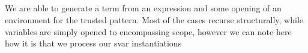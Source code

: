 {\begin{code}
\<%
\\
%
\>[4]\AgdaSpace{}%
\AgdaSymbol{(}\AgdaSpace{}%
\AgdaOperator{\AgdaInductiveConstructor{-,}}\AgdaSpace{}%
\AgdaSymbol{)}\AgdaSpace{}%
\AgdaSymbol{=}\AgdaSpace{}%
\AgdaSpace{}%
\AgdaSpace{}%
\AgdaOperator{\AgdaInductiveConstructor{-,}}\AgdaSpace{}%
\AgdaSpace{}%
\AgdaSpace{}%
\<%
\\
\>[0]\AgdaSpace{}%
\AgdaSymbol{\{}\AgdaSpace{}%
\AgdaSymbol{=}\AgdaSpace{}%
\AgdaSymbol{\}}\AgdaSpace{}%
\AgdaSpace{}%
\AgdaSymbol{(}\AgdaSpace{}%
\AgdaSymbol{)}\AgdaSpace{}%
\AgdaSymbol{=}\AgdaSpace{}%
\AgdaSpace{}%
\<%
\\
\>[0]\AgdaSpace{}%
\AgdaSymbol{\{}\AgdaSpace{}%
\AgdaSymbol{=}\AgdaSpace{}%
\AgdaSymbol{\}}\AgdaSpace{}%
\AgdaSpace{}%
\AgdaSymbol{(}\AgdaSpace{}%
\AgdaSpace{}%
\AgdaSymbol{)}\AgdaSpace{}%
\AgdaSymbol{=}\AgdaSpace{}%
\AgdaSpace{}%
\AgdaSymbol{(}\AgdaSpace{}%
\AgdaSpace{}%
\AgdaSymbol{)}\AgdaSpace{}%
\AgdaSymbol{(}\AgdaSpace{}%
\AgdaSpace{}%
\AgdaSymbol{)}\<%
\\
\>[0]\AgdaSpace{}%
\AgdaSymbol{\{}\AgdaSpace{}%
\AgdaSymbol{=}\AgdaSpace{}%
\AgdaSymbol{\}}\AgdaSpace{}%
\AgdaSpace{}%
\AgdaSymbol{(}\AgdaSpace{}%
\AgdaSpace{}%
\AgdaSymbol{)}\AgdaSpace{}%
\AgdaSymbol{=}\AgdaSpace{}%
\AgdaSpace{}%
\AgdaSpace{}%
\AgdaSpace{}%
\AgdaSpace{}%
\AgdaSpace{}%
\AgdaSpace{}%
\<%
\end{code}
}

We are able to generate a term from an expression and some opening
of an environment for the trusted pattern. Most of the cases recurse
structurally, while variables are simply opened to encompassing scope,
however we can note here how it is that we process our svar instantiations

